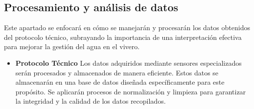 \subsection{Procesamiento y análisis de datos}
Este apartado se enfocará en cómo se manejarán y procesarán los datos obtenidos
del protocolo técnico, subrayando la
importancia de una interpretación efectiva para mejorar la gestión del agua en
el vivero.

\begin{itemize}
        \bigbreak 

        \item \textbf{Protocolo Técnico}
                \bigbreak
                Los datos adquiridos mediante sensores especializados serán procesados y almacenados de manera eficiente. Estos datos se almacenarán en una base de datos diseñada específicamente para este propósito. Se aplicarán procesos de normalización y limpieza para garantizar la integridad y la calidad de los datos recopilados.

\end{itemize}


